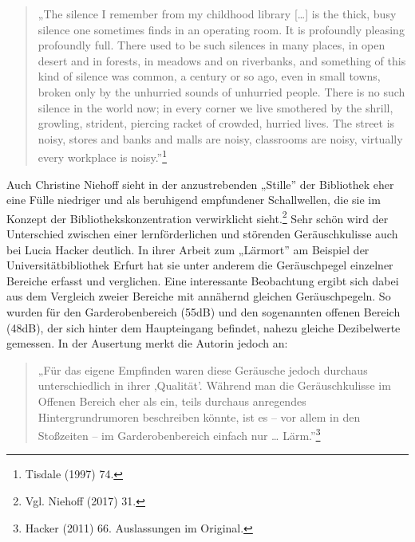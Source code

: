 \documentclass[a4paper,
fontsize=11pt,
oneside,
numbers=noperiodatend,
parskip=half-,
bibliography=totoc,
final
]{scrartcl}
\begin{document}
\begin{quote}
„The silence I remember from my childhood library {[}\ldots{]} is the
thick, busy silence one sometimes finds in an operating room. It is
profoundly pleasing profoundly full. There used to be such silences in
many places, in open desert and in forests, in meadows and on
riverbanks, and something of this kind of silence was common, a century
or so ago, even in small towns, broken only by the unhurried sounds of
unhurried people. There is no such silence in the world now; in every
corner we live smothered by the shrill, growling, strident, piercing
racket of crowded, hurried lives. The street is noisy, stores and banks
and malls are noisy, classrooms are noisy, virtually every workplace is
noisy.''\footnote{Tisdale (1997) 74.}
\end{quote}

Auch Christine Niehoff sieht in der anzustrebenden „Stille'' der
Bibliothek eher eine Fülle niedriger und als beruhigend empfundener
Schallwellen, die sie im Konzept der Bibliothekskonzentration
verwirklicht sieht.\footnote{Vgl. Niehoff (2017) 31.} Sehr schön wird
der Unterschied zwischen einer lernförderlichen und störenden
Geräuschkulisse auch bei Lucia Hacker deutlich. In ihrer Arbeit zum
„Lärmort'' am Beispiel der Universitätbibliothek Erfurt hat sie unter
anderem die Geräuschpegel einzelner Bereiche erfasst und verglichen.
Eine interessante Beobachtung ergibt sich dabei aus dem Vergleich zweier
Bereiche mit annähernd gleichen Geräuschpegeln. So wurden für den
Garderobenbereich (55dB) und den sogenannten offenen Bereich (48dB), der
sich hinter dem Haupteingang befindet, nahezu gleiche Dezibelwerte
gemessen. In der Ausertung merkt die Autorin jedoch an:

\begin{quote}
„Für das eigene Empfinden waren diese Geräusche jedoch durchaus
unterschiedlich in ihrer ‚Qualität'. Während man die Geräuschkulisse im
Offenen Bereich eher als ein, teils durchaus anregendes
Hintergrundrumoren beschreiben könnte, ist es -- vor allem in den
Stoßzeiten -- im Garderobenbereich einfach nur \ldots{}
Lärm.''\footnote{Hacker (2011) 66. Auslassungen im Original.}
\end{quote}
\end{document}
